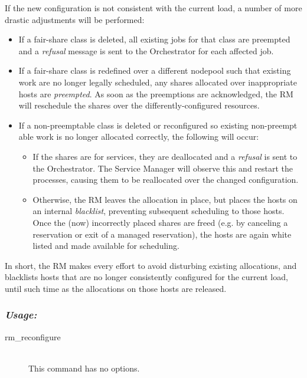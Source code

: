     If the new configuration is not consistent with the current load, a number of more drastic
    adjustments will be performed:
    \begin{itemize}
      \item If a fair-share class is deleted, all existing jobs for that class are preempted
        and a {\em refusal} message is sent to the Orchestrator for each affected job.
      \item If a fair-share class is redefined over a different nodepool such that existing
        work are no longer legally scheduled, any shares allocated over inappropriate
        hosts are {\em preempted}.  As soon as the preemptions are acknowledged, the RM
        will reschedule the shares over the differently-configured resources.
      \item If a non-preemptable class is deleted or reconfigured so existing non-preempt able
        work is no longer allocated correctly, the following will occur:
        \begin{itemize}
            \item If the shares are for services, they are deallocated and a {\em refusal} is
              sent to the Orchestrator.  The Service Manager will observe this and restart the
              processes, causing them to be reallocated over the changed configuration.
            \item Otherwise, the RM leaves the allocation in place, but places the hosts on an
              internal {\em blacklist}, preventing subsequent scheduling to those hosts. Once
              the (now) incorrectly placed shares are freed (e.g. by canceling a reservation or
              exit of a managed reservation), the hosts are again white listed and made available
              for scheduling.
        \end{itemize}
     \end{itemize}
        
    In short, the RM makes every effort to avoid disturbing existing allocations, and blacklists
    hosts that are no longer consistently configured for the current load, until such time as
    the allocations on those hosts are released.

    \subsubsection{\em Usage:}

    \begin{description}
      \item[rm\_reconfigure] \hfill \\ 
        This command has no options.
      \end{description}
             

